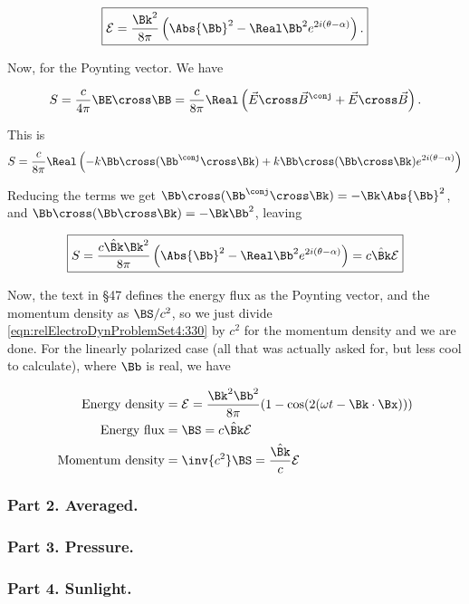 \begin{equation}\label{eqn:relElectroDynProblemSet4:290}
\boxed{
\mathcal{E} 
=
\frac{ \Bk^2 }{8\pi}
\left(
\Abs{\Bb}^2 
-\Real \Bb^2 e^{2 i(\theta - \alpha)} 
\right).
}
\end{equation}

Now, for the Poynting vector.  We have

\begin{equation}\label{eqn:relElectroDynProblemSet4:310}
S = \frac{c}{4 \pi} \BE \cross \BB = \frac{c}{8 \pi} \Real \left( \vec{E} \cross \vec{B}^\conj + \vec{E} \cross \vec{B} \right).
\end{equation}

This is
\begin{align*}
S 
&= \frac{c}{8 \pi} \Real \left( -k \Bb \cross (\Bb^\conj \cross \Bk) + k \Bb \cross (\Bb \cross \Bk ) e^{2 i(\theta - \alpha)} \right) \\
\end{align*}

Reducing the terms we get $\Bb \cross (\Bb^\conj \cross \Bk) = -\Bk \Abs{\Bb}^2$, and $\Bb \cross (\Bb \cross \Bk) = -\Bk \Bb^2$, leaving

\begin{equation}\label{eqn:relElectroDynProblemSet4:330}
\boxed{
S 
= \frac{c \hat{\Bk} \Bk^2 }{8 \pi} \left( \Abs{\Bb}^2 - \Real \Bb^2 e^{2 i(\theta - \alpha)} \right) = c \hat{\Bk} \mathcal{E}
}
\end{equation}

Now, the text in \S 47 defines the energy flux as the Poynting vector, and the momentum density as $\BS/c^2$, so we just divide \ref{eqn:relElectroDynProblemSet4:330} by $c^2$ for the momentum density and we are done.  For the linearly polarized case (all that was actually asked for, but less cool to calculate), where $\Bb$ is real, we have

\begin{align}\label{eqn:relElectroDynProblemSet4:350}
\mbox{Energy density} &= \mathcal{E} = \frac{ \Bk^2 \Bb^2 }{8\pi} ( 1 - \cos( 2 (\omega t - \Bk \cdot \Bx)) ) \\
\mbox{Energy flux} &= \BS = c \hat{\Bk} \mathcal{E} \\
\mbox{Momentum density} &= \inv{c^2} \BS = \frac{\hat{\Bk}}{c} \mathcal{E}
\end{align}

\subsubsection{Part 2.  Averaged.}
\subsubsection{Part 3.  Pressure.}
\subsubsection{Part 4.  Sunlight.}



\EndArticle
